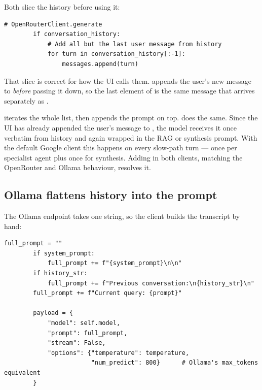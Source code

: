 Both slice the history before using it:

\begin{lstlisting}[style=py]
        # OpenRouterClient.generate
        if conversation_history:
            # Add all but the last user message from history
            for turn in conversation_history[:-1]:
                messages.append(turn)
\end{lstlisting}

That slice is correct for how the UI calls them.  appends the user's new message to  \emph{before} passing it down, so the last element of  is the same message that arrives separately as .

\begin{bug}[title={Google and OpenAI send the current message twice}]
 iterates the whole list, then appends the prompt on top.  does the same. Since the UI has already appended the user's message to , the model receives it once verbatim from history and again wrapped in the RAG or synthesis prompt. With the default Google client this happens on every slow-path turn --- once per specialist agent plus once for synthesis. Adding \code{[:-1]} in both clients, matching the OpenRouter and Ollama behaviour, resolves it.
\end{bug}

\subsection{Ollama flattens history into the prompt}

The Ollama  endpoint takes one string, so the client builds the transcript by hand:

\begin{lstlisting}[style=py,firstnumber=66]
        full_prompt = ""
        if system_prompt:
            full_prompt += f"{system_prompt}\n\n"
        if history_str:
            full_prompt += f"Previous conversation:\n{history_str}\n"
        full_prompt += f"Current query: {prompt}"

        payload = {
            "model": self.model,
            "prompt": full_prompt,
            "stream": False,
            "options": {"temperature": temperature,
                        "num_predict": 800}      # Ollama's max_tokens equivalent
        }
\end{lstlisting}

